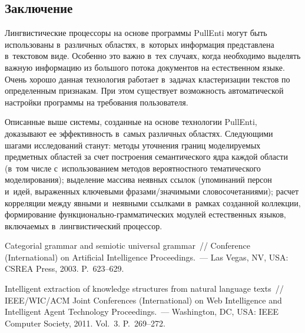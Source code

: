 \begin{multicols}{2}
   \vspace*{-13pt}
   
  \section{Заключение}
  \vspace*{-3pt}
  
   Лингвистические процессоры на основе программы PullEnti могут быть 
использованы в~различных областях, в~которых информация пред\-став\-ле\-на 
в~текс\-то\-вом виде. Особенно это важно в~тех случаях, когда необходимо 
выделять важ\-ную информацию из большого потока документов на 
естественном языке. Очень хорошо данная технология работает в~задачах 
кластеризации текстов по определенным признакам. При этом существует 
воз\-мож\-ность автоматической настройки программы на требования 
пользователя.
   
   Описанные выше системы, созданные на основе технологии PullEnti, 
доказывают ее эффективность в~самых различных областях. Сле\-ду\-ющи\-ми 
шагами исследований станут: методы уточнения границ мо\-де\-ли\-ру\-емых 
предметных областей за счет построения семантического ядра каж\-дой 
области (в~том чис\-ле с~использованием методов вероятностного 
тематического моделирования); выделение массива неявных ссылок 
(упоминаний персон и~идей, выраженных ключевыми фра\-за\-ми/зна\-чи\-мы\-ми 
словосочетаниями); расчет корреляции между явными и~неявными ссылками 
в~рамках созданной коллекции, формирование  
функ\-цио\-на\-ль\-но-грам\-ма\-ти\-че\-ских модулей естественных языков, 
включаемых в~лингвистический процессор.

    
{\small\frenchspacing
 {%
 \begin{thebibliography}{99}

 \vspace*{-4pt}

 Categorial grammar and semiotic universal grammar~// 
Conference (International) on Artificial Intelligence Proceedings.~--- 
Las Vegas, NV, USA: CSREA Press, 2003. 
P.~623--629.

Intelligent extraction of knowledge structures from natural language texts~// 
IEEE/WIC/ACM Joint Conferences (International) on Web Intelligence and 
Intelligent Agent Technology Proceedings.~---
Washington, DC, USA: IEEE Computer Society, 2011. Vol.~3. P.~269--272.


\end{thebibliography}}}
\end{multicols}
